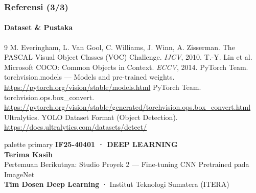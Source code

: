 \documentclass[t,aspectratio=169,xcolor=dvipsnames]{beamer}
\begin{document}
\begin{frame}
    \frametitle{Referensi (3/3)}
    \framesubtitle{Dataset \& Pustaka}
    \scriptsize
    \begin{thebibliography}{9}
         M. Everingham, L. Van Gool, C. Williams, J. Winn, A. Zisserman. The PASCAL Visual Object Classes (VOC) Challenge. \textit{IJCV}, 2010.
         T.-Y. Lin et al. Microsoft COCO: Common Objects in Context. \textit{ECCV}, 2014.
         PyTorch Team. torchvision.models --- Models and pre-trained weights. \url{https://pytorch.org/vision/stable/models.html}
         PyTorch Team. torchvision.ops.box\_convert. \url{https://pytorch.org/vision/stable/generated/torchvision.ops.box_convert.html}
         Ultralytics. YOLO Dataset Format (Object Detection). \url{https://docs.ultralytics.com/datasets/detect/}
    \end{thebibliography}
\end{frame}

\begin{frame}[plain]
  \begin{beamercolorbox}[wd=\paperwidth,ht=\paperheight,sep=1.5cm]{palette primary}
    \vspace{1.5cm}
    {\scriptsize\bfseries\color{dlMute}IF25-40401 · DEEP LEARNING}\\[0.4cm]
    {\Huge\bfseries Terima Kasih}\\[0.4cm]
    {\small Pertemuan Berikutnya: Studio Proyek 2 --- Fine-tuning CNN Pretrained pada ImageNet}\\[1.0cm]
    \vfill
    {\scriptsize\textbf{Tim Dosen Deep Learning} · Institut Teknologi Sumatera (ITERA)}
  \end{beamercolorbox}
\end{frame}
\end{document}

